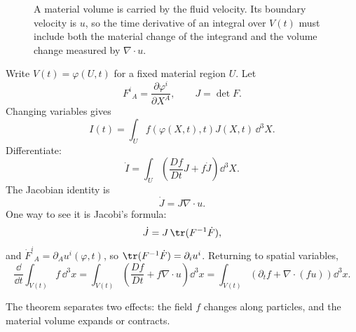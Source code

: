 \begin{figure}[htbp]
\centering
{}
\caption{A material volume is carried by the fluid velocity. Its boundary
velocity is \(u\), so the time derivative of an integral over \(V(t)\) must
include both the material change of the integrand and the volume change
measured by \(\nabla\cdot u\).}
\label{fig:reynolds-material-volume}
\end{figure}

\begin{derivation}
Write \(V(t)=\varphi(U,t)\) for a fixed material region \(U\). Let
\[
  F^i{}_A=\frac{\partial\varphi^i}{\partial X^A},
  \qquad
  J=\det F.
\]
Changing variables gives
\[
  I(t)=\int_U f(\varphi(X,t),t)J(X,t)\,\dd^3X.
\]
Differentiate:
\[
  \dot I
  =
  \int_U
  \left(
    \frac{D f}{D t}J+f\dot J
  \right)\dd^3X.
\]
The Jacobian identity is
\[
  \dot J=J\nabla\cdot u.
\]
One way to see it is Jacobi's formula:
\[
  \dot J=J\,\tr(F^{-1}\dot F),
\]
and \(\dot F^i{}_A=\partial_Au^i(\varphi,t)\), so
\(\tr(F^{-1}\dot F)=\partial_i u^i\). Returning to spatial variables,
\[
  \boxed{
  \frac{\dd}{\dd t}\int_{V(t)} f\,\dd^3x
  =
  \int_{V(t)}
  \left(
    \frac{D f}{D t}+f\nabla\cdot u
  \right)\dd^3x
  =
  \int_{V(t)}
  \left(
    \partial_t f+\nabla\cdot(fu)
  \right)\dd^3x.
  }
\]
\end{derivation}

The theorem separates two effects: the field \(f\) changes along particles, and
the material volume expands or contracts.


